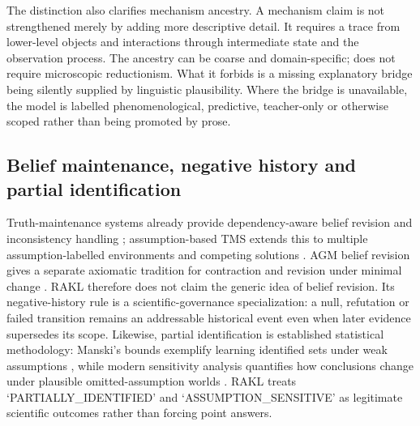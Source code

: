 The distinction also clarifies mechanism ancestry. A mechanism claim is not strengthened merely by adding more descriptive detail. It requires a trace from lower-level objects and interactions through intermediate state and the observation process. The ancestry can be coarse and domain-specific; \RAKL{} does not require microscopic reductionism. What it forbids is a missing explanatory bridge being silently supplied by linguistic plausibility. Where the bridge is unavailable, the model is labelled phenomenological, predictive, teacher-only or otherwise scoped rather than being promoted by prose.

\subsection{Belief maintenance, negative history and partial identification}
Truth-maintenance systems already provide dependency-aware belief revision and inconsistency handling \cite{doyle1979}; assumption-based TMS extends this to multiple assumption-labelled environments and competing solutions \cite{dekleer1986}. AGM belief revision gives a separate axiomatic tradition for contraction and revision under minimal change \cite{agm1985}. RAKL therefore does not claim the generic idea of belief revision. Its negative-history rule is a scientific-governance specialization: a null, refutation or failed transition remains an addressable historical event even when later evidence supersedes its scope. Likewise, partial identification is established statistical methodology: Manski's bounds exemplify learning identified sets under weak assumptions \cite{manski1990}, while modern sensitivity analysis quantifies how conclusions change under plausible omitted-assumption worlds \cite{cinelli2020}. RAKL treats `PARTIALLY\_IDENTIFIED' and `ASSUMPTION\_SENSITIVE' as legitimate scientific outcomes rather than forcing point answers.
